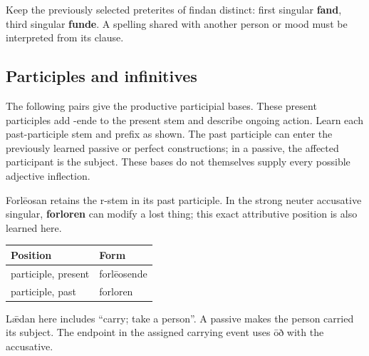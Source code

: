 Keep the previously selected preterites of findan distinct: first singular \textbf{fand}, third singular \textbf{funde}. A spelling shared with another person or mood must be interpreted from its clause.

\subsection*{Participles and infinitives}

The following pairs give the productive participial bases. These present participles add -ende to the present stem and describe ongoing action. Learn each past-participle stem and prefix as shown. The past participle can enter the previously learned passive or perfect constructions; in a passive, the affected participant is the subject. These bases do not themselves supply every possible adjective inflection.

Forlēosan retains the r-stem in its past participle. In the strong neuter accusative singular, \textbf{forloren} can modify a lost thing; this exact attributive position is also learned here.

\par\begingroup
\fontsize{10.5}{13.2}\selectfont
\setlength{\LTleft}{0pt}\setlength{\LTright}{\fill}
\noindent
\begin{tabular}{@{}>{\raggedright\arraybackslash}p{69.12mm}>{\raggedright\arraybackslash}p{52.07mm}@{}}
\toprule
\textbf{Position} & \textbf{Form} \\
\midrule
participle, present & forlēosende \\
participle, past & forloren \\
\bottomrule
\end{tabular}
\par\endgroup

Lǣdan here includes “carry; take a person”. A passive makes the person carried its subject. The endpoint in the assigned carrying event uses ōð with the accusative.

